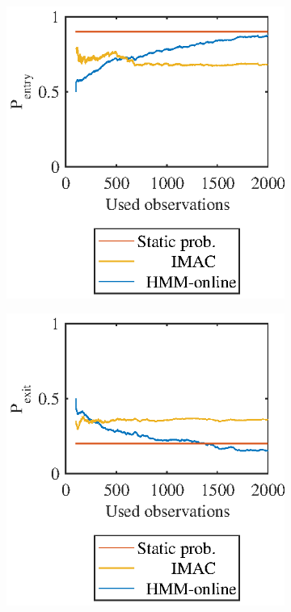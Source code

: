 \begin{figure}[htbp]
    \centering
    \begin{subfigure}[t]{0.45\textwidth}
        \includegraphics[width=1.0\textwidth]{chapters/mapping_of_dynamic_areas/figures/markow_learn_1d_entry}	
    \end{subfigure}
    \begin{subfigure}[t]{0.45\textwidth}
        \includegraphics[width=1.0\textwidth]{chapters/mapping_of_dynamic_areas/figures/markow_learn_1d_exit}

\end{subfigure}
\end{figure}
